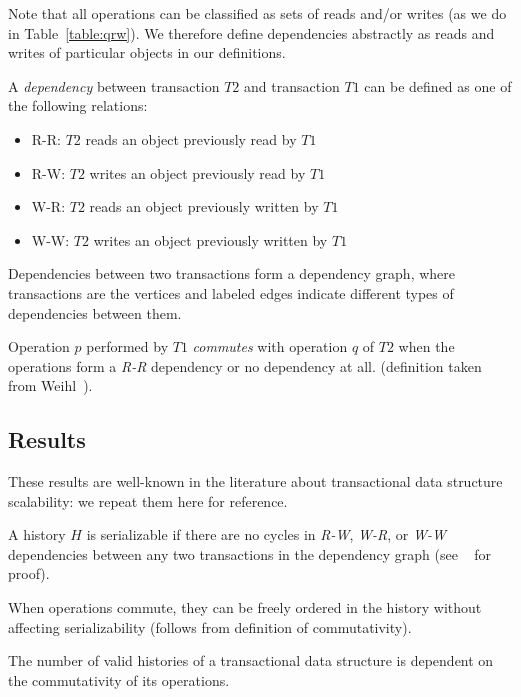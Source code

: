 Note that all operations can be classified as sets of reads and/or writes (as we do in Table~\ref{table:qrw}). We therefore define dependencies abstractly as reads and writes of particular objects in our definitions.

\begin{defn}
    A \emph{dependency} between transaction $T2$ and transaction $T1$ can be defined as one of the following relations:
    \begin{itemize}
        \item R-R: $T2$ reads an object previously read by $T1$
        \item R-W: $T2$ writes an object previously read by $T1$
        \item W-R: $T2$ reads an object previously written by $T1$
        \item W-W: $T2$ writes an object previously written by $T1$
    \end{itemize}
    Dependencies between two transactions form a dependency graph, where transactions are the vertices and labeled edges indicate different types of dependencies between them.
\end{defn}

\begin{defn}
    Operation $p$ performed by $T1$ \emph{commutes} with operation $q$ of $T2$ when the operations form a \emph{R-R} dependency or no dependency at all.
(definition taken from Weihl~\cite{weihl}).
\end{defn}

\subsection{Results}

These results are well-known in the literature about transactional data structure scalability: we repeat them here for reference.
\begin{theorem}
    A history $H$ is serializable if there are no cycles in \emph{R-W}, \emph{W-R}, or \emph{W-W} dependencies between any two transactions in the dependency graph (see ~\cite{schwarz} for proof).
\end{theorem}

\begin{theorem}
    When operations commute, they can be freely ordered in the history without affecting serializability (follows from definition of commutativity).
\end{theorem}

\begin{corollary}
    The number of valid histories of a transactional data structure is dependent on the commutativity of its operations.
\end{corollary}

